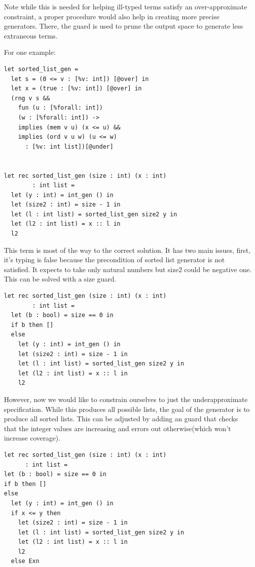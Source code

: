 \documentclass[review, sigplan]{acmart}
\begin{document}
Note while this is needed for helping ill-typed terms satisfy an
over-approximate constraint, a proper procedure would also help in creating more
precise generators. There, the guard is used to prune the output space to
generate less extraneous terms.

For one example:

\begin{lstlisting}[language=caml, basicstyle=\small\ttfamily]
let sorted_list_gen =
  let s = (0 <= v : [%v: int]) [@over] in
  let x = (true : [%v: int]) [@over] in
  (rng v s &&
    fun (u : [%forall: int])
    (w : [%forall: int]) ->
    implies (mem v u) (x <= u) &&
    implies (ord v u w) (u <= w)
      : [%v: int list])[@under]


let rec sorted_list_gen (size : int) (x : int)
        : int list =
  let (y : int) = int_gen () in
  let (size2 : int) = size - 1 in
  let (l : int list) = sorted_list_gen size2 y in
  let (l2 : int list) = x :: l in
  l2

\end{lstlisting}

This term is most of the way to the correct solution. It has two main issues,
first, it's typing is false because the precondition of sorted list generator is
not satisfied. It expects to take only natural numbers but size2 could be
negative one. This can be solved with a size guard.

\begin{lstlisting}[language=caml, basicstyle=\small\ttfamily]
let rec sorted_list_gen (size : int) (x : int)
        : int list =
  let (b : bool) = size == 0 in
  if b then []
  else
    let (y : int) = int_gen () in
    let (size2 : int) = size - 1 in
    let (l : int list) = sorted_list_gen size2 y in
    let (l2 : int list) = x :: l in
    l2
\end{lstlisting}

However, now we would like to constrain ourselves to just the underapproximate specification. While this
produces all possible lists, the goal of the generator is to produce all sorted
lists. This can be adjusted by adding an guard that checks that the
integer values are increasing and errors out otherwise(which won't increase coverage).

\begin{lstlisting}[language=caml, basicstyle=\small\ttfamily]
let rec sorted_list_gen (size : int) (x : int)
      : int list =
let (b : bool) = size == 0 in
if b then []
else
  let (y : int) = int_gen () in
  if x <= y then
    let (size2 : int) = size - 1 in
    let (l : int list) = sorted_list_gen size2 y in
    let (l2 : int list) = x :: l in
    l2
  else Exn
\end{lstlisting}
\end{document}
